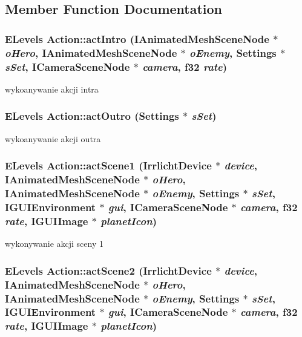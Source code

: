 \subsection{Member Function Documentation}
\hypertarget{class_action_a2368aab6973f05206b296b39756dcbdc}{
\subsubsection[{actIntro}]{\setlength{\rightskip}{0pt plus 5cm}ELevels Action::actIntro (IAnimatedMeshSceneNode $\ast$ {\em oHero}, \/  IAnimatedMeshSceneNode $\ast$ {\em oEnemy}, \/  {\bf Settings} $\ast$ {\em sSet}, \/  ICameraSceneNode $\ast$ {\em camera}, \/  f32 {\em rate})}}
\label{class_action_a2368aab6973f05206b296b39756dcbdc}
wykoanywanie akcji intra \hypertarget{class_action_ac563c0b77763d7f05e8168e4c3737ab6}{
\subsubsection[{actOutro}]{\setlength{\rightskip}{0pt plus 5cm}ELevels Action::actOutro ({\bf Settings} $\ast$ {\em sSet})}}
\label{class_action_ac563c0b77763d7f05e8168e4c3737ab6}
wykoanywanie akcji outra \hypertarget{class_action_aa18c8609e5caabcb26d3c6b93d92159b}{
\subsubsection[{actScene1}]{\setlength{\rightskip}{0pt plus 5cm}ELevels Action::actScene1 (IrrlichtDevice $\ast$ {\em device}, \/  IAnimatedMeshSceneNode $\ast$ {\em oHero}, \/  IAnimatedMeshSceneNode $\ast$ {\em oEnemy}, \/  {\bf Settings} $\ast$ {\em sSet}, \/  IGUIEnvironment $\ast$ {\em gui}, \/  ICameraSceneNode $\ast$ {\em camera}, \/  f32 {\em rate}, \/  IGUIImage $\ast$ {\em planetIcon})}}
\label{class_action_aa18c8609e5caabcb26d3c6b93d92159b}
wykonywanie akcji sceny 1 \hypertarget{class_action_af11f32ac4273cc82c15cf5f3263c8a51}{
\subsubsection[{actScene2}]{\setlength{\rightskip}{0pt plus 5cm}ELevels Action::actScene2 (IrrlichtDevice $\ast$ {\em device}, \/  IAnimatedMeshSceneNode $\ast$ {\em oHero}, \/  IAnimatedMeshSceneNode $\ast$ {\em oEnemy}, \/  {\bf Settings} $\ast$ {\em sSet}, \/  IGUIEnvironment $\ast$ {\em gui}, \/  ICameraSceneNode $\ast$ {\em camera}, \/  f32 {\em rate}, \/  IGUIImage $\ast$ {\em planetIcon})}}

